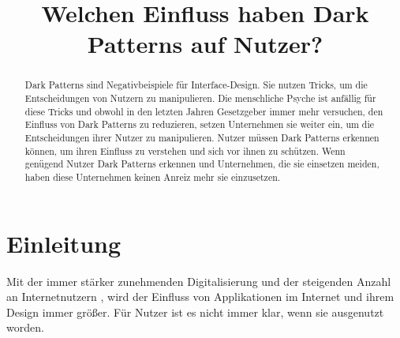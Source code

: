 \documentclass[conference,compsoc,final,a4paper]{IEEEtran}
\newcommand{\autoren}[0]{Karhan, Marvin}
\newcommand{\dokumententitel}[0]{Welchen Einfluss haben Dark Patterns auf Nutzer?}
\begin{document}
\title{\dokumententitel}

\author{
  \IEEEauthorblockN{\autoren}
}

\maketitle
\thispagestyle{plain}
\pagestyle{plain}


\begin{abstract}
  Dark Patterns sind Negativbeispiele für Interface-Design. Sie nutzen Tricks, um die Entscheidungen von Nutzern zu manipulieren. Die menschliche Psyche ist anfällig für diese Tricks und obwohl in den letzten Jahren Gesetzgeber immer mehr versuchen, den Einfluss von Dark Patterns zu reduzieren, setzen Unternehmen sie weiter ein, um die Entscheidungen ihrer Nutzer zu manipulieren. Nutzer müssen Dark Patterns erkennen können, um ihren Einfluss zu verstehen und sich vor ihnen zu schützen. Wenn genügend Nutzer Dark Patterns erkennen und Unternehmen, die sie einsetzen meiden, haben diese Unternehmen keinen Anreiz mehr sie einzusetzen.
\end{abstract}

{\small\tableofcontents}

\section{Einleitung}
Mit der immer stärker zunehmenden Digitalisierung und der steigenden Anzahl an Internetnutzern \autocite{ITU2020}, wird der Einfluss von Applikationen im Internet und ihrem Design immer größer. Für Nutzer ist es nicht immer klar, wenn sie ausgenutzt worden.
\end{document}
